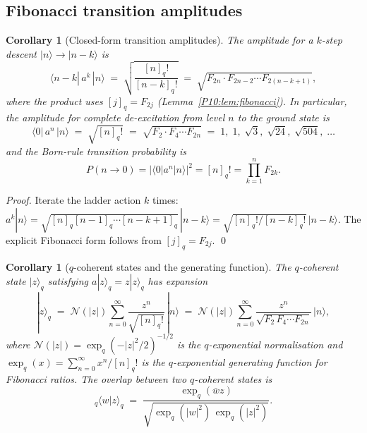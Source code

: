 \documentclass[11pt,a4paper]{article}
\newtheorem{corollary}[theorem]{Corollary}
\theoremstyle{definition}
\theoremstyle{remark}
\begin{document}
\subsection{Fibonacci transition amplitudes}

\begin{corollary}[Closed-form transition amplitudes]
\label{P10:cor:amplitudes}
The amplitude for a $k$-step descent $|n\rangle\to|n-k\rangle$ is
\begin{equation}
  \boxed{\langle n-k|\,a^k\,|n\rangle
  \;=\; \sqrt{\frac{[n]_q!}{[n-k]_q!}}
  \;=\; \sqrt{F_{2n}\cdot F_{2n-2}\cdots F_{2(n-k+1)}}},
  \label{P10:eq:amplitude}
\end{equation}
where the product uses $[j]_q = F_{2j}$ (Lemma~\ref{P10:lem:fibonacci}).
In particular, the amplitude for complete de-excitation from level $n$
to the ground state is
\begin{equation}
  \langle 0|\,a^n\,|n\rangle
  \;=\; \sqrt{[n]_q!}
  \;=\; \sqrt{F_2\cdot F_4\cdots F_{2n}}
  \;=\; 1,\;1,\;\sqrt{3},\;\sqrt{24},\;\sqrt{504},\;\ldots
  \label{P10:eq:full_deexcitation}
\end{equation}
and the Born-rule transition probability is
\begin{equation}
  P(n\to 0) = |\langle 0|a^n|n\rangle|^2
  = [n]_q! = \prod_{k=1}^n F_{2k}.
  \label{P10:eq:prob_n0}
\end{equation}
\end{corollary}

\begin{proof}
Iterate the ladder action $k$ times:
$a^k|n\rangle = \sqrt{[n]_q[n-1]_q\cdots[n-k+1]_q}\,|n-k\rangle
= \sqrt{[n]_q!/[n-k]_q!}\,|n-k\rangle$.
The explicit Fibonacci form follows from $[j]_q = F_{2j}$.
\qed
\end{proof}

\begin{corollary}[$q$-coherent states and the generating function]
\label{P10:cor:coherent}
The $q$-coherent state $|z\rangle_q$ satisfying $a|z\rangle_q = z|z\rangle_q$ has
expansion
\begin{equation}
  |z\rangle_q
  \;=\; \mathcal{N}(|z|)\sum_{n=0}^\infty
  \frac{z^n}{\sqrt{[n]_q!}}\,|n\rangle
  \;=\; \mathcal{N}(|z|)\sum_{n=0}^\infty
  \frac{z^n}{\sqrt{F_2\,F_4\cdots F_{2n}}}\,|n\rangle,
  \label{P10:eq:q_coherent}
\end{equation}
where $\mathcal{N}(|z|) = \exp_q(-|z|^2/2)^{-1/2}$ is the
$q$-exponential normalisation and
$\exp_q(x) = \sum_{n=0}^\infty x^n/[n]_q!$
is the $q$-exponential generating function for Fibonacci ratios.
The overlap between two $q$-coherent states is
\begin{equation}
  {}_q\langle w|z\rangle_q
  \;=\; \frac{\exp_q(\bar{w}z)}{\sqrt{\exp_q(|w|^2)\,\exp_q(|z|^2)}}.
  \label{P10:eq:coherent_overlap}
\end{equation}
\end{corollary}
\end{document}
